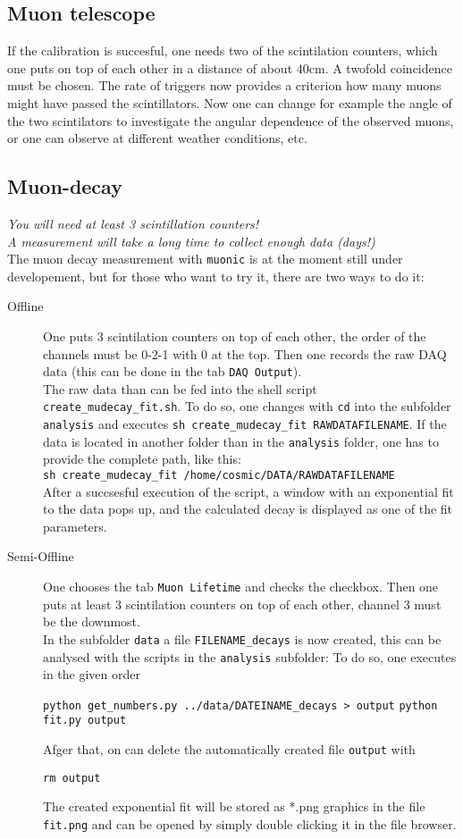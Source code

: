 \documentclass[a4paper,12pt]{article}
\begin{document}
\subsection{Muon telescope}
If the calibration is succesful, one needs two of the scintilation counters, which one puts on top of each other in a distance of about 40cm. A twofold coincidence must be chosen. The rate of triggers now provides a criterion how many muons might have passed the scintillators. Now one can change for example the angle of the two scintilators to investigate the angular dependence of the observed muons, or one can observe at different weather conditions, etc.
\subsection{Muon-decay}
\emph{You will need at least 3 scintillation counters!}\\
\emph{A measurement will take a long time to collect enough data (days!)}\\
The muon decay measurement with \verb|muonic| is at the moment still under developement, but for those who want to try it, there are two ways to do it:
\begin{description}
\item[Offline] One puts 3 scintilation counters on top of each other, the order of the channels must be 0-2-1 with 0 at the top. Then one records the raw DAQ data (this can be done in the tab \verb|DAQ Output|).\\
The raw data than can be fed into the shell script \verb|create_mudecay_fit.sh|. To do so, one changes with \verb|cd| into the subfolder \verb|analysis| and executes \verb|sh create_mudecay_fit RAWDATAFILENAME|. If the data is located in another folder than in the \verb|analysis| folder, one has to provide the complete path, like this:\\
\verb|sh create_mudecay_fit /home/cosmic/DATA/RAWDATAFILENAME|\\
After a succsesful execution of the script, a window with an exponential fit to the data pops up, and the calculated decay is displayed as one of the fit parameters.
\item[Semi-Offline] One chooses the tab \verb|Muon Lifetime| and checks the checkbox. Then one puts at least 3 scintilation counters on top of each other, channel 3 must be the downmost.\\
In the subfolder \verb|data| a file \verb|FILENAME_decays| is now created, this can be analysed with the scripts in the \verb|analysis| subfolder:
To do so, one executes in the given order
\begin{center}
\verb|python get_numbers.py ../data/DATEINAME_decays > output|
\verb|python fit.py output|
\end{center}
Afger that, on can delete the automatically created file \verb|output| with
\begin{center}
\verb|rm output|
\end{center}
The created exponential fit will be stored as *.png graphics in the file \verb|fit.png| and can be opened by simply double clicking it in the file browser.
\end{description}
\end{document}
